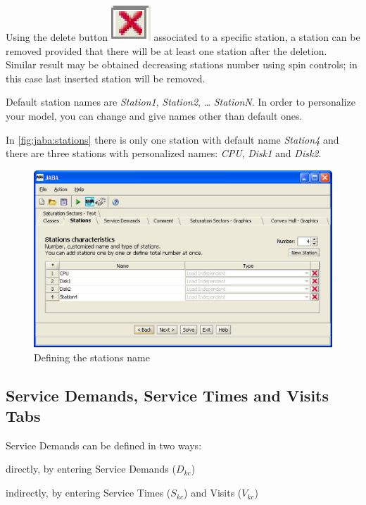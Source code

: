Using the delete button
\includegraphics[scale=.6]{img/jaba/x} associated to a specific
station, a station can be removed provided that there will be at
least one station after the deletion. Similar result may be obtained decreasing stations number using spin controls; in this case last inserted station will be removed.

Default station names are \emph{Station1}, \emph{Station2}, \dots
\emph{StationN}. In order to personalize your model, you can change
and give names other than default ones.

In \autoref{fig:jaba:stations} there is only one station with
default name \emph{Station4} and there are three stations with
personalized names: \emph{CPU}, \emph{Disk1} and \emph{Disk2}.

\begin{figure}[htbp]
    \begin{center}
        \includegraphics[scale=.5]{img/jaba/4stations}
    \end{center}
    \caption{Defining the stations name}
    \label{fig:jaba:stations}
\end{figure}


\subsection{Service Demands, Service Times and Visits Tabs}
\label{sec:jaba:ServiceDemand} Service Demands can be defined in two
ways:
\begin{itemize*}
\item directly, by entering Service Demands ($D_{kc}$)
\item indirectly, by entering Service Times ($S_{kc}$) and Visits ($V_{kc}$)
\end{itemize*}


